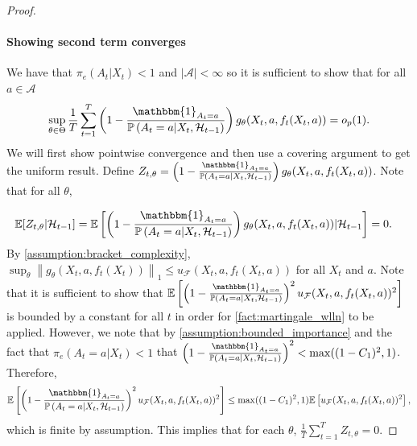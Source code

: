 \documentclass[11pt]{article}
\newcommand{\E}{\mathbb{E}}
\newcommand{\norm}[1]{\left\lVert#1\right\rVert}
\begin{document}
\begin{appendix}
\begin{proof}
\paragraph{Showing second term converges}
We have that $\pi_e{}(A_t|X_t) < 1$ and $|\mathcal{A}| <\infty$ so it is sufficient to show that for all $a \in \mathcal{A}$
 $$\sup_{\theta \in\Theta}\frac{1}{T}\sum_{t=1}^{T}\left(1 - \frac{\mathbbm{1}_{A_{t} = a} }{\mathbb{P} \left(A_{t} =a | X_{t},\mathcal{H}_{t-1} \right)}\right) g_{\theta}(X_{t},a,f_{t}(X_{t},a)) =o_{p}(1).$$
We will first show pointwise convergence and then use a covering argument to get the uniform result. Define $Z_{t,\theta} = \left(1 - \frac{\mathbbm{1}_{A_{t} = a} }{\mathbb{P} \left(A_{t} =a | X_{t},\mathcal{H}_{t-1} \right)}\right) g_{\theta}(X_{t},a,f_{t}(X_{t},a))$. Note that for all $\theta$, 

\begin{align*}
 \E[Z_{t,\theta}|\mathcal{H}_{t-1}] &= \E \left[  \left(1 - \frac{\mathbbm{1}_{A_{t} = a} }{\mathbb{P} \left(A_{t} =a | X_{t},\mathcal{H}_{t-1} \right)}\right) g_{\theta}(X_{t},a,f_{t}
 (X_{t},a))|\mathcal{H}_{t-1}\right] = 0.
\end{align*}
By \cref{assumption:bracket_complexity}, 
 $\sup_{\theta} \norm{g_{\theta}(X_t,a,f_{t}(X_t))}_{1} \le u_{\mathcal{F}}(X_{t},a,f_{t}(X_{t},a))$ for all $X_t$ and $a$. Note that it is sufficient to show that $\mathbb{E} \left[\left(1 - \frac{\mathbbm{1}_{A_{t} = a} }{\mathbb{P} \left(A_{t} =a | X_{t},\mathcal{H}_{t-1} \right)}\right)^{2} u_{\mathcal{F}}(X_{t},a,f_{t}(X_{t},a))^{2}\right] $
is bounded by a constant for all $t$ in order for \cref{fact:martingale_wlln} to be applied.  However, we note that by \cref{assumption:bounded_importance} and the fact that $\pi_{e}(A_{t} =a | X_{t}) < 1$ that $\left(1 - \frac{\mathbbm{1}_{A_{t} = a} }{\mathbb{P} \left(A_{t} =a | X_{t},\mathcal{H}_{t-1} \right)}\right)^{2} < \max((1-C_{1})^{2},1) $. Therefore, 
$$\mathbb{E} \left[\left(1 - \frac{\mathbbm{1}_{A_{t} = a} }{\mathbb{P} \left(A_{t} =a | X_{t},\mathcal{H}_{t-1} \right)}\right)^{2} u_{\mathcal{F}}(X_{t},a,f_{t}(X_{t},a))^{2}\right] \le \max((1-C_{1})^{2},1) \mathbb{E}\left[ u_{\mathcal{F}}(X_{t},a,f_{t}(X_{t},a))^{2} \right],$$
which is finite by assumption. This implies that for each $\theta$, $\frac{1}{T} \sum_{t=1}^{T} Z_{t,\theta} = 0 $.


\end{proof}
\end{appendix}
\end{document}
